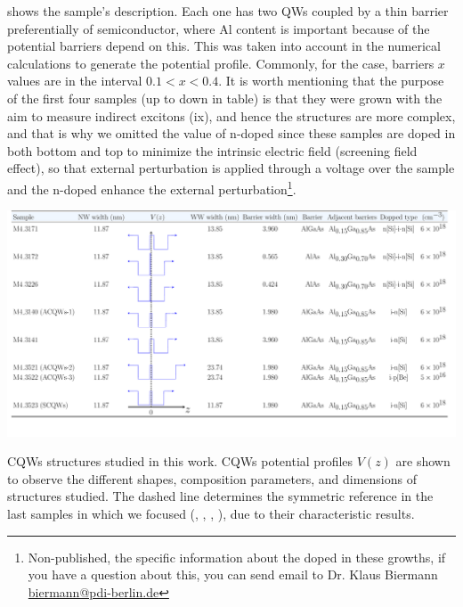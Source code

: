  shows the sample's description. Each one has two \gls{QW}s coupled by a thin barrier preferentially of \algaas semiconductor, where Al content is important because of the
potential barriers depend on this. This was taken into account in the numerical calculations to generate the potential profile. Commonly, for the case, \algaas barriers $x$ values are in the interval  $0.1<x<0.4$. It is worth mentioning that the purpose of the first four samples (up to down in table) is that they were grown with the aim to measure indirect excitons (\gls{ix}), and hence the structures are more complex, and that is why we omitted the value of n-doped since these samples are doped in both bottom and top to minimize the intrinsic electric field (screening field
effect), so that external perturbation is applied through a voltage over the sample \cite{yuan2018tunneling}
and the n-doped enhance the external perturbation\footnote{Non-published, the specific information about the doped  in these growths, if you have a question about this, you can send email to Dr. Klaus Biermann \url{biermann@pdi-berlin.de}}.
\begin{landscape}
	\begin{table}
		\centering
		\includegraphics[width=\textwidth]{../tables/chapter-3/table-1-samples/build-ruco/table-1-samples.pdf}
		\caption[Table of samples description]{CQWs structures studied in this work.  CQWs potential profiles $V(z)$ are shown to observe the different shapes, composition parameters, and dimensions of structures studied. The dashed line determines the symmetric reference in the last samples in which we focused (\tucu, \tcvu, \tcvd, \tcvt), due to their characteristic results. }
		\label{tab:chapter3:Samples description} 
	\end{table}
\end{landscape}
